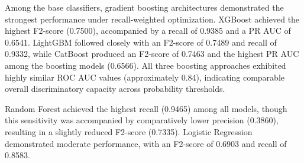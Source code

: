 \documentclass[a4paper,twoside]{article}
\begin{document}
\begin{table}[H]
\caption{Comparative Performance Analysis of Classifiers using Imbalance-Robust Metrics} 
\label{tab:model_results} 
\centering 
{} 
\end{table}

Among the base classifiers, gradient boosting architectures demonstrated the strongest performance under recall-weighted optimization. XGBoost achieved the highest F2-score (0.7500), accompanied by a recall of 0.9385 and a PR AUC of 0.6541. LightGBM followed closely with an F2-score of 0.7489 and recall of 0.9332, while CatBoost produced an F2-score of 0.7463 and the highest PR AUC among the boosting models (0.6566). All three boosting approaches exhibited highly similar ROC AUC values (approximately 0.84), indicating comparable overall discriminatory capacity across probability thresholds.

Random Forest achieved the highest recall (0.9465) among all models, though this sensitivity was accompanied by comparatively lower precision (0.3860), resulting in a slightly reduced F2-score (0.7335). Logistic Regression demonstrated moderate performance, with an F2-score of 0.6903 and recall of 0.8583.
\end{document}
